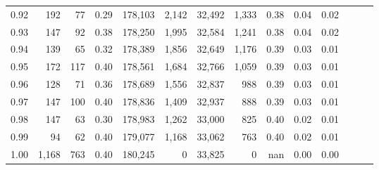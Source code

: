 \begin{tabular}{rrrrrrrrrrrrrr}
0.92 &    192 &   77 &  0.29 &  178,103 &    2,142 &  32,492 &   1,333 &  0.38 &  0.04 &      0.02 \\
0.93 &    147 &   92 &  0.38 &  178,250 &    1,995 &  32,584 &   1,241 &  0.38 &  0.04 &      0.02 \\
0.94 &    139 &   65 &  0.32 &  178,389 &    1,856 &  32,649 &   1,176 &  0.39 &  0.03 &      0.01 \\
0.95 &    172 &  117 &  0.40 &  178,561 &    1,684 &  32,766 &   1,059 &  0.39 &  0.03 &      0.01 \\
0.96 &    128 &   71 &  0.36 &  178,689 &    1,556 &  32,837 &     988 &  0.39 &  0.03 &      0.01 \\
0.97 &    147 &  100 &  0.40 &  178,836 &    1,409 &  32,937 &     888 &  0.39 &  0.03 &      0.01 \\
0.98 &    147 &   63 &  0.30 &  178,983 &    1,262 &  33,000 &     825 &  0.40 &  0.02 &      0.01 \\
0.99 &     94 &   62 &  0.40 &  179,077 &    1,168 &  33,062 &     763 &  0.40 &  0.02 &      0.01 \\
1.00 &  1,168 &  763 &  0.40 &  180,245 &        0 &  33,825 &       0 &   nan &  0.00 &      0.00 \\
\bottomrule
\end{tabular}
